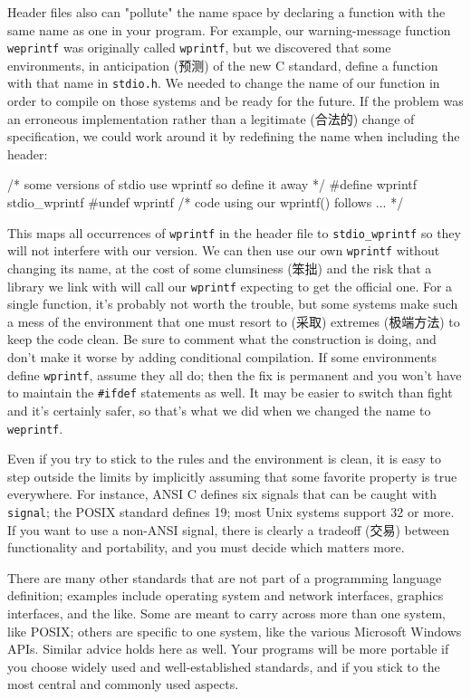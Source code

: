 Header files also can "pollute" the name space by declaring a function with
the same name as one in your program. For example, our warning-message
function \verb'weprintf' was originally called \verb'wprintf', but we
discovered that some environments, in anticipation (预测) of the new C
standard, define a function with that name in \verb'stdio.h'.  We needed to
change the name of our function in order to compile on those systems and be
ready for the future. If the problem was an erroneous implementation rather
than a legitimate (合法的) change of specification, we could work around it
by redefining the name when including the header:
\begin{badcode}
    /* some versions of stdio use wprintf so define it away */
    #define wprintf stdio_wprintf
    #undef wprintf
    /* code using our wprintf() follows ... */
\end{badcode}
This maps all occurrences of \verb'wprintf' in the header file to
\verb'stdio_wprintf' so they will not interfere with our version. We can
then use our own \verb'wprintf' without changing its name, at the cost of
some clumsiness (笨拙) and the risk that a library we link with will call
our \verb'wprintf' expecting to get the official one. For a single
function, it's probably not worth the trouble, but some systems make such a
mess of the environment that one must resort to (采取) extremes (极端方法)
to keep the code clean. Be sure to comment what the construction is doing,
and don't make it worse by adding conditional compilation. If some
environments define \verb'wprintf', assume they all do; then the fix is
permanent and you won't have to maintain the \verb'#ifdef' statements as
well.  It may be easier to switch than fight and it's certainly safer, so
that's what we did when we changed the name to \verb'weprintf'.

Even if you try to stick to the rules and the environment is clean, it is
easy to step outside the limits by implicitly assuming that some favorite
property is true everywhere. For instance, ANSI C defines six signals that
can be caught with \verb'signal'; the POSIX standard defines 19; most Unix
systems support 32 or more. If you want to use a non-ANSI signal, there is
clearly a tradeoff (交易) between functionality and portability, and you
must decide which matters more.

There are many other standards that are not part of a programming language
definition; examples include operating system and network interfaces,
graphics interfaces, and the like. Some are meant to carry across more than
one system, like POSIX; others are specific to one system, like the various
Microsoft Windows APIs.  Similar advice holds here as well. Your programs
will be more portable if you choose widely used and well-established
standards, and if you stick to the most central and commonly used aspects.

